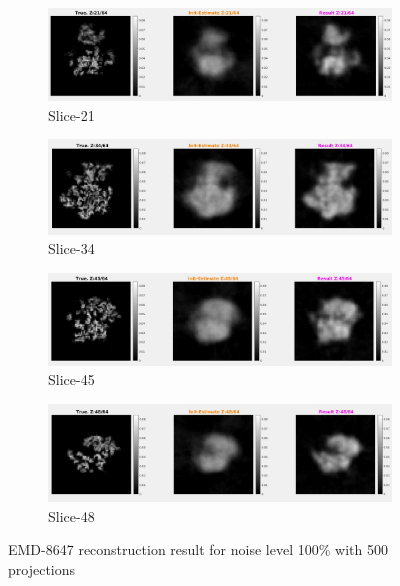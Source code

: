 \documentclass{report}
\begin{document}
\begin{figure}[H]
\centering

\begin{subfigure}{1\textwidth}
\centering
\includegraphics[width=1\linewidth]{emd_8647_result_1.png}
\captionsetup{justification=centering}
\caption{ Slice-21 }
\end{subfigure} 

\begin{subfigure}{1\textwidth}
\centering
\includegraphics[width=1\linewidth]{emd_8647_result_2.png}
\captionsetup{justification=centering}
\caption{ Slice-34 }
\end{subfigure} 

\begin{subfigure}{1\textwidth}
\centering
\includegraphics[width=1\linewidth]{emd_8647_result_3.png}
\captionsetup{justification=centering}
\caption{ Slice-45 }
\end{subfigure} 

\begin{subfigure}{1\textwidth}
\centering
\includegraphics[width=1\linewidth]{emd_8647_result_4.png}
\captionsetup{justification=centering}
\caption{ Slice-48 }
\end{subfigure} 


\caption{EMD-8647 reconstruction result for noise level 100\% with 500 projections}
\label{fig:EMD-8647 Reconstruction: Result-noise 100}
\end{figure}
\end{document}
